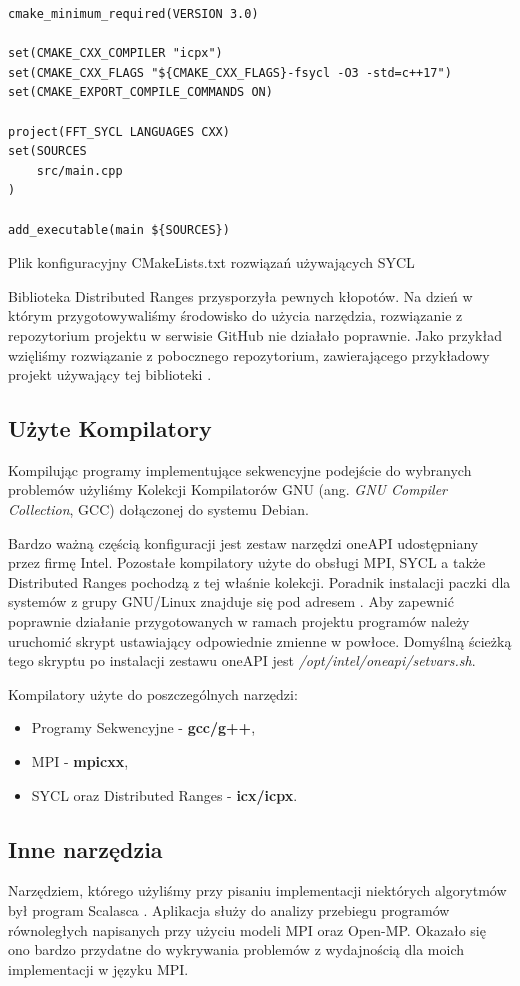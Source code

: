 \documentclass[a4paper,12pt]{book} %
\begin{document}
\begin{lstfloat}
\begin{lstlisting}[frame=single]
cmake_minimum_required(VERSION 3.0)

set(CMAKE_CXX_COMPILER "icpx")
set(CMAKE_CXX_FLAGS "${CMAKE_CXX_FLAGS}-fsycl -O3 -std=c++17")
set(CMAKE_EXPORT_COMPILE_COMMANDS ON)

project(FFT_SYCL LANGUAGES CXX)
set(SOURCES 
    src/main.cpp
)

add_executable(main ${SOURCES})
\end{lstlisting}
\caption{Plik konfiguracyjny CMakeLists.txt rozwiązań używających SYCL}
\label{lst::cmake-SYCL}
\end{lstfloat}

Biblioteka Distributed Ranges przysporzyła pewnych kłopotów. Na dzień w którym przygotowywaliśmy środowisko do użycia narzędzia, rozwiązanie z repozytorium projektu w serwisie GitHub nie działało poprawnie. Jako przykład wzięliśmy rozwiązanie z pobocznego repozytorium, zawierającego przykładowy projekt używający tej biblioteki \cite{dist-ranges-tutorial}.
\subsection{Użyte Kompilatory}
Kompilując programy implementujące sekwencyjne podejście do wybranych problemów użyliśmy Kolekcji Kompilatorów GNU (ang. \emph{GNU Compiler Collection}, GCC) dołączonej do systemu Debian.

Bardzo ważną częścią konfiguracji jest zestaw narzędzi oneAPI udostępniany przez firmę Intel. Pozostałe kompilatory użyte do obsługi MPI, SYCL a także Distributed Ranges pochodzą z tej właśnie kolekcji. Poradnik instalacji paczki dla systemów z grupy GNU/Linux znajduje się pod adresem \cite{oneapi-install}. Aby zapewnić poprawnie działanie przygotowanych w ramach projektu programów należy uruchomić skrypt ustawiający odpowiednie zmienne w powłoce. Domyślną ścieżką tego skryptu po instalacji zestawu oneAPI jest \emph{/opt/intel/oneapi/setvars.sh}.

Kompilatory użyte do poszczególnych narzędzi:
\begin{itemize}
\item Programy Sekwencyjne - \textbf{gcc/g++},
\item MPI - \textbf{mpicxx},
\item SYCL oraz Distributed Ranges - \textbf{icx/icpx}.
\end{itemize}

\subsection{Inne narzędzia}
Narzędziem, którego użyliśmy przy pisaniu implementacji niektórych algorytmów był program Scalasca \cite{scalasca}. Aplikacja służy do analizy przebiegu programów równoległych napisanych przy użyciu modeli MPI oraz Open-MP. Okazało się ono bardzo przydatne do wykrywania problemów z wydajnością dla moich implementacji w języku MPI.
\end{document}
